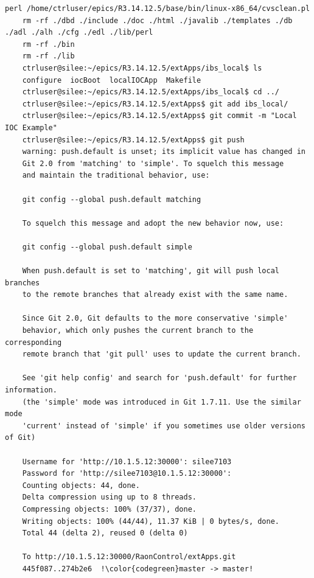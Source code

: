 \documentclass[11pt
  , a4paper
  , article
  , oneside
]{memoir}
\begin{document}
\begin{lstlisting}[style=termstyle, escapechar=!]
	perl /home/ctrluser/epics/R3.14.12.5/base/bin/linux-x86_64/cvsclean.pl
	rm -rf ./dbd ./include ./doc ./html ./javalib ./templates ./db ./adl ./alh ./cfg ./edl ./lib/perl
	rm -rf ./bin
	rm -rf ./lib
	ctrluser@silee:~/epics/R3.14.12.5/extApps/ibs_local$ ls
	configure  iocBoot  localIOCApp  Makefile
	ctrluser@silee:~/epics/R3.14.12.5/extApps/ibs_local$ cd ../
	ctrluser@silee:~/epics/R3.14.12.5/extApps$ git add ibs_local/
	ctrluser@silee:~/epics/R3.14.12.5/extApps$ git commit -m "Local IOC Example"
	ctrluser@silee:~/epics/R3.14.12.5/extApps$ git push
	warning: push.default is unset; its implicit value has changed in
	Git 2.0 from 'matching' to 'simple'. To squelch this message
	and maintain the traditional behavior, use:
	
	git config --global push.default matching
	
	To squelch this message and adopt the new behavior now, use:
	
	git config --global push.default simple
	
	When push.default is set to 'matching', git will push local branches
	to the remote branches that already exist with the same name.
	
	Since Git 2.0, Git defaults to the more conservative 'simple'
	behavior, which only pushes the current branch to the corresponding
	remote branch that 'git pull' uses to update the current branch.
	
	See 'git help config' and search for 'push.default' for further information.
	(the 'simple' mode was introduced in Git 1.7.11. Use the similar mode
	'current' instead of 'simple' if you sometimes use older versions of Git)
	
	Username for 'http://10.1.5.12:30000': silee7103
	Password for 'http://silee7103@10.1.5.12:30000': 
	Counting objects: 44, done.
	Delta compression using up to 8 threads.
	Compressing objects: 100% (37/37), done.
	Writing objects: 100% (44/44), 11.37 KiB | 0 bytes/s, done.
	Total 44 (delta 2), reused 0 (delta 0)

	To http://10.1.5.12:30000/RaonControl/extApps.git
	445f087..274b2e6  !\color{codegreen}master -> master!
	
	\end{lstlisting}    		
\clearpage
\end{document}
